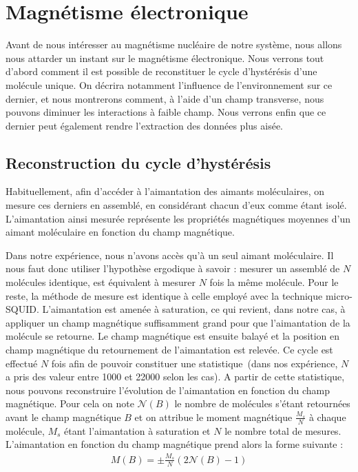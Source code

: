 \section{Magnétisme électronique}
Avant de nous intéresser au magnétisme nucléaire de notre système, nous allons nous attarder un instant sur le magnétisme électronique. Nous verrons tout d'abord comment il est possible de reconstituer le cycle d'hystérésis d'une molécule unique. On décrira notamment l'influence de l'environnement sur ce dernier, et nous montrerons comment, à l'aide d'un champ transverse, nous pouvons diminuer les interactions à faible champ. Nous verrons enfin que ce dernier peut également rendre l'extraction des données plus aisée.

\subsection{Reconstruction du cycle d’hystérésis}
Habituellement, afin d'accéder à l'aimantation des aimants moléculaires, on mesure ces derniers en assemblé, en considérant chacun d'eux comme étant isolé. L'aimantation ainsi mesurée représente les propriétés magnétiques moyennes d'un aimant moléculaire en fonction du champ magnétique.

Dans notre expérience, nous n'avons accès qu'à un seul aimant moléculaire. Il nous faut donc utiliser l'hypothèse ergodique à savoir : mesurer un assemblé de $N$ molécules identique, est équivalent à mesurer $N$ fois la même molécule. Pour le reste, la méthode de mesure est identique à celle employé avec la technique micro-SQUID. L'aimantation est amenée à saturation, ce qui revient, dans notre cas, à appliquer un champ magnétique suffisamment grand pour que l'aimantation de la molécule se retourne. Le champ magnétique est ensuite balayé et la position en champ magnétique du retournement de l'aimantation est relevée. Ce cycle est effectué $N$ fois afin de pouvoir constituer une statistique~(dans nos expérience, $N$ a pris des valeur entre 1000 et 22000 selon les cas). A partir de cette statistique, nous pouvons reconstruire l'évolution de l'aimantation en fonction du champ magnétique. Pour cela on note $\mathscr{N}(B)$ le nombre de molécules s'étant retournées avant le champ magnétique $B$ et on attribue le moment magnétique $\frac{M_s}{N}$ à chaque molécule, $M_s$ étant l'aimantation à saturation et $N$ le nombre total de mesures. L'aimantation en fonction du champ magnétique prend alors la forme suivante :
\begin{eqnarray}
M(B) =\pm \frac{M_s}{N}(2\mathscr{N}(B) -1)\nonumber
\end{eqnarray}


